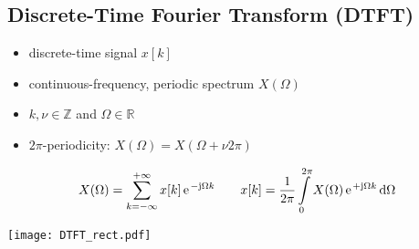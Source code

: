 \documentclass[landscape,columns=3]{cheatsheet} %
\begin{document}
\subsection{Discrete-Time Fourier Transform (DTFT)}
%
\begin{itemize}
\setlength\itemsep{-0.5em}
\item discrete-time signal $x[k]$
%
\item continuous-frequency, periodic spectrum $X(\Omega)$
%
\item $k,\nu\in\mathbb{Z}$ and $\Omega\in\mathbb{R}$
%
\item  $2\pi$-periodicity: $X(\Omega)=X(\Omega+\nu2\pi)$
\end{itemize}
%
\begin{align*}
X(\Omega) = \sum\limits_{k=-\infty}^{+\infty} x[k] \,\e^{-\im \Omega k}
\qquad
x[k] = \frac{1}{2\pi}\int\limits_{0}^{2\pi} X(\Omega) \,\e^{+\im \Omega k}\,\mathrm{d}\Omega
\end{align*}
%
%
\begin{minipage}{\columnwidth}
	\texttt{[image: DTFT\_rect.pdf]}
\end{minipage}
\end{document}
